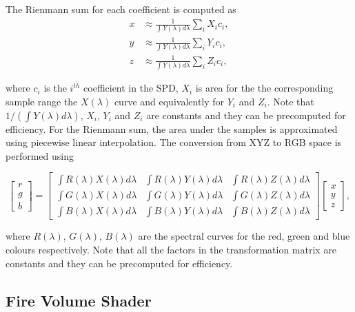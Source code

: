 The Rienmann sum for each coefficient is computed as
\begin{equation}
\begin{split}
x &\approx \frac{1}{\int Y(\lambda) d\lambda} \sum_i X_i c_i, \\
y &\approx \frac{1}{\int Y(\lambda) d\lambda} \sum_i Y_i c_i, \\
z &\approx \frac{1}{\int Y(\lambda) d\lambda} \sum_i Z_i c_i,
\end{split}
\end{equation}

where $c_i$ is the $i^{th}$ coefficient in the SPD, $X_i$ is area for the the corresponding sample range the $X(\lambda)$ curve and equivalently for $Y_i$ and $Z_i$.
Note that $1 / \left(\int Y(\lambda) d\lambda \right)$, $X_i$, $Y_i$ and $Z_i$ are constants and they can be precomputed for efficiency.
For the Rienmann sum, the area under the samples is approximated using piecewise linear interpolation.
The conversion from XYZ to RGB space is performed using

\begin{equation}
\begin{bmatrix}
r \\
g \\
b
\end{bmatrix}
 = 
\begin{bmatrix}
\int R(\lambda) X(\lambda) d\lambda & \int R(\lambda) Y(\lambda) d\lambda & \int R(\lambda) Z(\lambda) d\lambda \\
\int G(\lambda) X(\lambda) d\lambda & \int G(\lambda) Y(\lambda) d\lambda & \int G(\lambda) Z(\lambda) d\lambda \\
\int B(\lambda) X(\lambda) d\lambda & \int B(\lambda) Y(\lambda) d\lambda & \int B(\lambda) Z(\lambda) d\lambda
\end{bmatrix}
\begin{bmatrix}
x \\
y \\
z
\end{bmatrix},
\end{equation}

where $R(\lambda)$, $G(\lambda)$, $B(\lambda)$ are the spectral curves for the red, green and blue colours respectively.
Note that all the factors in the transformation matrix are constants and they can be precomputed for efficiency.

\subsection{Fire Volume Shader}
\label{sec:fire_volume_shader}

